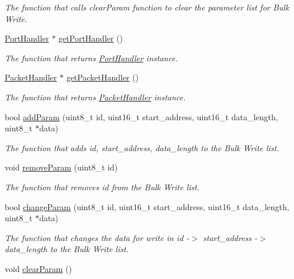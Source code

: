 \begin{DoxyCompactItemize}
\begin{DoxyCompactList}\small\item\em The function that calls clear\+Param function to clear the parameter list for Bulk Write. \end{DoxyCompactList}\item 
\hyperlink{classmercury_1_1_port_handler}{Port\+Handler} $\ast$ \hyperlink{classmercury_1_1_write_direct_ac447b89976ab92d7e5e46e8a4033ba4f}{get\+Port\+Handler} ()
\begin{DoxyCompactList}\small\item\em The function that returns \hyperlink{classmercury_1_1_port_handler}{Port\+Handler} instance. \end{DoxyCompactList}\item 
\hyperlink{classmercury_1_1_packet_handler}{Packet\+Handler} $\ast$ \hyperlink{classmercury_1_1_write_direct_a4da01c379586d585bb496b2e4d181412}{get\+Packet\+Handler} ()
\begin{DoxyCompactList}\small\item\em The function that returns \hyperlink{classmercury_1_1_packet_handler}{Packet\+Handler} instance. \end{DoxyCompactList}\item 
bool \hyperlink{classmercury_1_1_write_direct_a0992e8d6d5801aeb39d8132eb4ea65a1}{add\+Param} (uint8\+\_\+t id, uint16\+\_\+t start\+\_\+address, uint16\+\_\+t data\+\_\+length, uint8\+\_\+t $\ast$data)
\begin{DoxyCompactList}\small\item\em The function that adds id, start\+\_\+address, data\+\_\+length to the Bulk Write list. \end{DoxyCompactList}\item 
void \hyperlink{classmercury_1_1_write_direct_a9772b23cd7e69a4a0b9dc7742fa517b6}{remove\+Param} (uint8\+\_\+t id)
\begin{DoxyCompactList}\small\item\em The function that removes id from the Bulk Write list. \end{DoxyCompactList}\item 
bool \hyperlink{classmercury_1_1_write_direct_a8f24364c84ca0b2d9b2ffa3b3e39aa79}{change\+Param} (uint8\+\_\+t id, uint16\+\_\+t start\+\_\+address, uint16\+\_\+t data\+\_\+length, uint8\+\_\+t $\ast$data)
\begin{DoxyCompactList}\small\item\em The function that changes the data for write in id -\/$>$ start\+\_\+address -\/$>$ data\+\_\+length to the Bulk Write list. \end{DoxyCompactList}\item 
void \hyperlink{classmercury_1_1_write_direct_a321549b5c54e5cd83cde4755255b24e6}{clear\+Param} ()\hypertarget{classmercury_1_1_write_direct_a321549b5c54e5cd83cde4755255b24e6}{}\label{classmercury_1_1_write_direct_a321549b5c54e5cd83cde4755255b24e6}


\end{DoxyCompactItemize}
